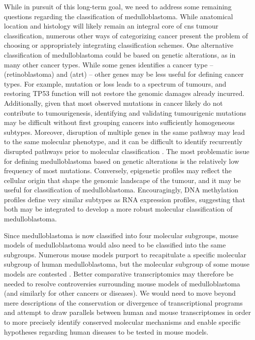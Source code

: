 While in pursuit of this long-term goal, we need to address some remaining questions regarding the classification of medulloblastoma. While anatomical location and histology will likely remain an integral core of \gls{cns} tumour classification, numerous other ways of categorizing cancer present the problem of choosing or appropriately integrating classification schemes. One alternative classification of medulloblastoma could be based on genetic alterations, as in many other cancer types. While some genes identifies a cancer type --  (retinoblastoma) and  (\gls{atrt}) -- other genes may be less useful for defining cancer types. For example,  mutation or loss leads to a spectrum of tumours, and restoring TP53 function will not restore the genomic damages already incurred. Additionally, given that most observed mutations in cancer likely do not contribute to tumourigenesis, identifying and validating tumourigenic mutations may be difficult without first grouping cancers into sufficiently homogeneous subtypes. Moreover, disruption of multiple genes in the same pathway may lead to the same molecular phenotype, and it can be difficult to identify recurrently disrupted pathways prior to molecular classification . The most problematic issue for defining medulloblastoma based on genetic alterations is the relatively low frequency of most mutations.  Conversely, epigenetic profiles may reflect the cellular origin that shape the genomic landscape of the tumour, and it may be useful for classification of medulloblastoma. Encouragingly, DNA methylation profiles define very similar subtypes as RNA expression profiles, suggesting that both may be integrated to develop a more robust molecular classification of medulloblastoma.

Since medulloblastoma is now classified into four molecular subgroups, mouse models of medulloblastoma would also need to be classified into the same subgroups. Numerous mouse models purport to recapitulate a specific molecular subgroup of human medulloblastoma,  but the molecular subgroup of some mouse models are contested . Better comparative transcriptomics may therefore be needed to resolve controversies surrounding mouse models of medulloblastoma (and similarly for other cancers or diseases). We would need to move beyond mere descriptions of the conservation or divergence of transcriptional programs and  attempt to draw parallels between human and mouse transcriptomes in order to more precisely identify conserved molecular mechanisms and enable specific hypotheses regarding human diseases to be tested in mouse models.

